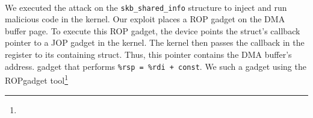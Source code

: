 \DIFdelbegin \paragraph{}
\addtocounter{paragraph}{-1}%
\DIFdelend \DIFaddbegin \smallskip
\noindent\textbf{}
\DIFaddend We executed the \textit{\DIFdelbegin {}\DIFdelend \DIFaddbegin {}\DIFaddend } attack on the \texttt{skb\_shared\_info} structure to inject and run malicious code in the kernel.
Our exploit places a ROP gadget on the DMA buffer page. To execute this ROP gadget, the device points the struct's callback pointer to a JOP gadget in the kernel. The kernel then passes the callback in the \DIFdelbegin {}\DIFdelend \DIFaddbegin \texttt{} \DIFaddend register to its containing struct. Thus, this pointer contains the DMA buffer's address. 
\DIFdelbegin {}\DIFdelend \DIFaddbegin {}\DIFaddend gadget that performs \texttt{\%rsp = \%rdi + const}. We \DIFdelbegin {}\DIFdelend \DIFaddbegin {}\DIFaddend such a gadget using the ROPgadget tool\DIFdelbegin {}\footnote{%
} %
\addtocounter{footnote}{-1}%
\DIFdelend \DIFaddbegin {}

 \DIFaddend